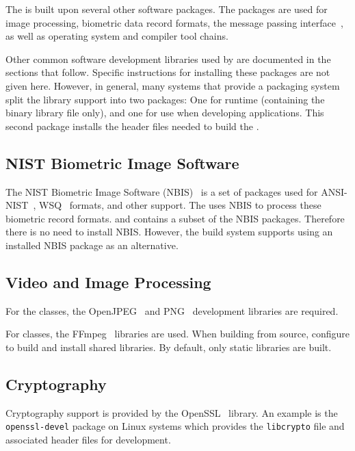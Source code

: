The \lname is built upon several other software packages. The packages are
used for image processing, biometric data record formats, the message
passing interface~\cite{mpi}, as well as operating system and compiler
tool chains.

Other common software development libraries used by \sname are documented in
the sections that follow. Specific instructions for installing these packages
are not given here. However, in general, many systems that provide a packaging
system split the library support into two packages: One for runtime (containing
the binary library file only), and one for use when developing applications.
This second package installs the header files needed to build the \sname.

\subsection{NIST Biometric Image Software}

The NIST Biometric Image Software (NBIS)~\cite{nist:nbis} is a set of packages
used for ANSI-NIST~\cite{std:an2k}, WSQ~\cite{std:wsq} formats, and other
support.  The \sname uses NBIS to process these biometric record formats.
and contains a subset of the NBIS packages. Therefore there is no need to
install NBIS.  However, the \sname build system supports using an installed
NBIS package as an alternative.

\subsection{Video and Image Processing}

For the  classes, the OpenJPEG~\cite{libopenjpeg} and
PNG~\cite{libpng} development libraries are required.

For  classes, the FFmpeg~\cite{libffmpeg} libraries are used.
When building from source, configure to build and
install shared libraries. By default, only static libraries are built.

\subsection{Cryptography}

Cryptography support is provided by the OpenSSL~\cite{openssl} library.
An example is the \texttt{openssl-devel} package on Linux systems which
provides the \texttt{libcrypto} file and associated header files for
development.

